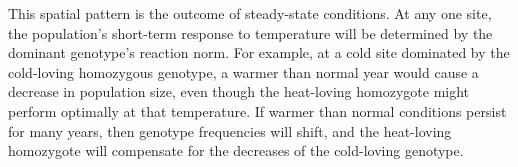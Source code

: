 \documentclass[11pt]{article}
\begin{document}
This spatial pattern is the outcome of steady-state conditions. At any one site, the population's short-term response to temperature will be determined by the dominant genotype's reaction norm. For example, at a cold site dominated by the cold-loving homozygous genotype, a warmer than normal year would cause a decrease in population size, even though the heat-loving homozygote might perform optimally at that temperature. If warmer than normal conditions persist for many years, then genotype frequencies will shift, and the heat-loving homozygote will compensate for the decreases of the cold-loving genotype. 


%
%



%
%
%
%
\end{document}
